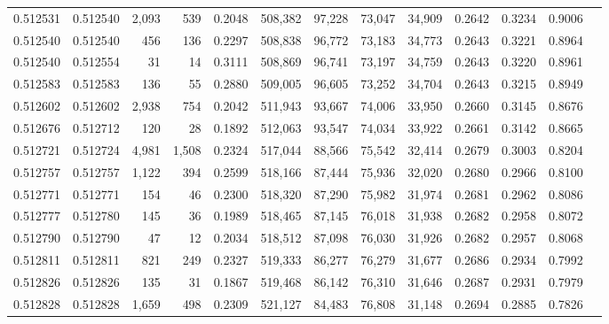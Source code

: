 \begin{tabular}{rrrrrrrrrrrrr}
0.512531 & 0.512540 & 2,093 &   539 &                                     0.2048 & 508,382 &  97,228 &  73,047 &  34,909 & 0.2642 & 0.3234 & 0.9006 \\
0.512540 & 0.512540 &   456 &   136 &                                     0.2297 & 508,838 &  96,772 &  73,183 &  34,773 & 0.2643 & 0.3221 & 0.8964 \\
0.512540 & 0.512554 &    31 &    14 &                                     0.3111 & 508,869 &  96,741 &  73,197 &  34,759 & 0.2643 & 0.3220 & 0.8961 \\
0.512583 & 0.512583 &   136 &    55 &                                     0.2880 & 509,005 &  96,605 &  73,252 &  34,704 & 0.2643 & 0.3215 & 0.8949 \\
0.512602 & 0.512602 & 2,938 &   754 &                                     0.2042 & 511,943 &  93,667 &  74,006 &  33,950 & 0.2660 & 0.3145 & 0.8676 \\
0.512676 & 0.512712 &   120 &    28 &                                     0.1892 & 512,063 &  93,547 &  74,034 &  33,922 & 0.2661 & 0.3142 & 0.8665 \\
0.512721 & 0.512724 & 4,981 & 1,508 &                                     0.2324 & 517,044 &  88,566 &  75,542 &  32,414 & 0.2679 & 0.3003 & 0.8204 \\
0.512757 & 0.512757 & 1,122 &   394 &                                     0.2599 & 518,166 &  87,444 &  75,936 &  32,020 & 0.2680 & 0.2966 & 0.8100 \\
0.512771 & 0.512771 &   154 &    46 &                                     0.2300 & 518,320 &  87,290 &  75,982 &  31,974 & 0.2681 & 0.2962 & 0.8086 \\
0.512777 & 0.512780 &   145 &    36 &                                     0.1989 & 518,465 &  87,145 &  76,018 &  31,938 & 0.2682 & 0.2958 & 0.8072 \\
0.512790 & 0.512790 &    47 &    12 &                                     0.2034 & 518,512 &  87,098 &  76,030 &  31,926 & 0.2682 & 0.2957 & 0.8068 \\
0.512811 & 0.512811 &   821 &   249 &                                     0.2327 & 519,333 &  86,277 &  76,279 &  31,677 & 0.2686 & 0.2934 & 0.7992 \\
0.512826 & 0.512826 &   135 &    31 &                                     0.1867 & 519,468 &  86,142 &  76,310 &  31,646 & 0.2687 & 0.2931 & 0.7979 \\
0.512828 & 0.512828 & 1,659 &   498 &                                     0.2309 & 521,127 &  84,483 &  76,808 &  31,148 & 0.2694 & 0.2885 & 0.7826 \\

\end{tabular}
